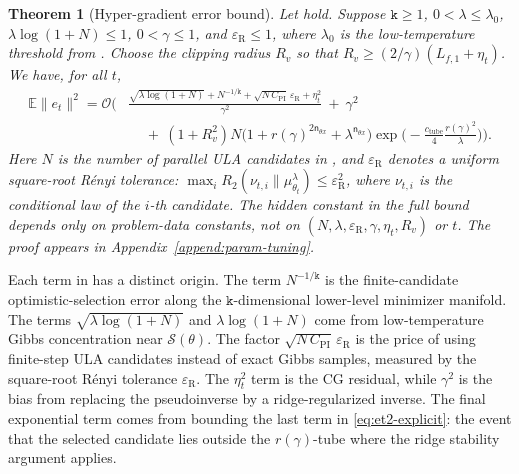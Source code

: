 \documentclass{article}
\theoremstyle{normaltheorem}
\newtheorem{theorem}{Theorem}[section]
\newcommand{\gibbs}{\mu}
\newcommand{\dimk}{\texttt{k}}
\newcommand{\calS}{\mathcal{S}}
\begin{document}
\begin{theorem}[Hyper-gradient error bound]\label{thm:main-et2-bound}
Let  hold. Suppose \(\dimk\ge1\), \(0<\lambda\le\lambda_0\), \(\lambda\log(1+N)\le1\), \(0<\gamma\le1\), and \(\varepsilon_{\mathrm R}\le1\), where
\(\lambda_0\) is the low-temperature threshold from .
Choose the clipping radius \(R_v\) so that \(R_v\ge (2/\gamma)(L_{f,1}+\eta_t)\). We have, for all \(t\),
\begin{align}
\mathbb E\|e_t\|^2
=
\mathcal{O}\!\Bigg(
&\frac{\sqrt{\lambda\log(1+N)}+N^{-1/\dimk}+\sqrt{N\,C_{\mathrm{PI}}}\,\varepsilon_{\mathrm R}+\eta_t^2}{\gamma^2}
\ +\ \gamma^2\nonumber\\
&\quad
\ +\ (1+R_v^2)N\big(1+r(\gamma)^{2\mathsf n_{\theta x}}+\lambda^{\mathsf n_{\theta x}}\big)
\exp\!\Big(-\tfrac{c_{\mathrm{tube}}}{4}\tfrac{r(\gamma)^2}{\lambda}\Big)
\Bigg).
\label{eq:main-et2-explicit-arxiv}
\end{align}
Here \(N\)  is the number of parallel ULA candidates in , and \(\varepsilon_{\mathrm R}\) denotes a uniform square-root R\'enyi tolerance:
\(\max_i R_2(\nu_{t,i}\|\gibbs_{\theta_t}^\lambda)\le \varepsilon_{\mathrm R}^2\), where \(\nu_{t,i}\) is the conditional law of the \(i\)-th candidate.
The hidden constant in the full bound depends only on problem-data constants, not on
\((N,\lambda,\varepsilon_{\mathrm R},\gamma,\eta_t,R_v)\) or \(t\). The proof appears in Appendix~\ref{append:param-tuning}.
\end{theorem}

Each term in  has a distinct origin. The term \(N^{-1/\dimk}\) is the finite-candidate
optimistic-selection error along the \(\dimk\)-dimensional lower-level minimizer manifold. The terms
\(\sqrt{\lambda\log(1+N)}\) and \(\lambda\log(1+N)\) come from low-temperature Gibbs concentration near
\(\calS(\theta)\). The factor \(\sqrt{N\,C_{\mathrm{PI}}}\,\varepsilon_{\mathrm R}\) is the price of using finite-step ULA
candidates instead of exact Gibbs samples, measured by the square-root R\'enyi tolerance \(\varepsilon_{\mathrm R}\).
The \(\eta_t^2\) term is the CG residual, while \(\gamma^2\) is the bias from replacing the pseudoinverse by a
ridge-regularized inverse. The final exponential term comes from bounding the last term in \eqref{eq:et2-explicit}: the
event that the selected candidate lies outside the \(r(\gamma)\)-tube where the ridge stability argument applies.
\end{document}
